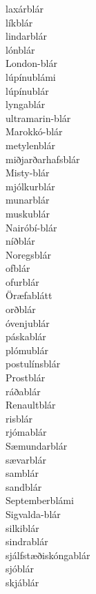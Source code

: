 \documentclass[../samsetningasafn.tex]{subfiles}
\begin{document}
\begin{bigwordlist}
\begin{footnotesize}
\begin{multicols}{4}
\begin{description}
		\item [laxárblár]
		\item [líkblár]
		\item [lindarblár]
		\item [lónblár]
		\item [London-blár]
		\item [lúpínublámi]
		\item [lúpínublár]
		\item [lyngablár]
		\item [ultramarin-blár]
		\item [Marokkó-blár]
		\item [metylenblár]
		\item [miðjarðarhafsblár]
		\item [Misty-blár]
		\item [mjólkurblár]
		\item [munarblár]
		\item [muskublár]
		\item [Nairóbí-blár]
		\item [níðblár]
		\item [Noregsblár]
		\item [ofblár]
		\item [ofurblár]
		\item [Öræfablátt]
		\item [orðblár]
		\item [óvenjublár]
		\item [páskablár]
		\item [plómublár]
		\item [postulínsblár]
		\item [Prostblár]
		\item [ráðablár]
		\item [Renaultblár]
		\item [risblár]
		\item [rjómablár]
		\item [Sæmundarblár]
		\item [sævarblár]
		\item [samblár]
		\item [sandblár]
		\item [Septemberblámi]
		\item [Sigvalda-blár]
		\item [silkiblár]
		\item [sindrablár]
		\item [sjálfstæðiskóngablár]
		\item [sjóblár]
		\item [skjáblár]

\end{description}
\end{multicols}
\end{footnotesize}
\end{bigwordlist}
\end{document}
